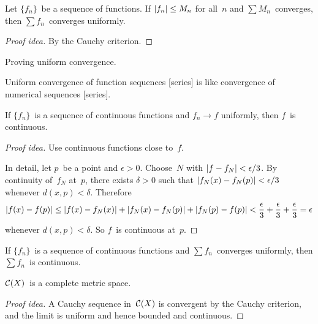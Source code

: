 \begin{thm}[Weierstrass]
Let \(\{f_n\}\)~be a sequence of functions. If \(|{f_n}|\le M_n\) for all~\(n\) and \(\sum M_n\)~converges, then \(\sum f_n\)~converges uniformly.
\end{thm}
\begin{proof}[Proof idea]
By the Cauchy criterion.
\end{proof}
\begin{app}
Proving uniform convergence.
\end{app}

\begin{rmk}
Uniform convergence of function sequences [series] is like convergence of numerical sequences [series].
\end{rmk}

\begin{thm}
If \(\{f_n\}\)~is a sequence of continuous functions and \(f_n\to f\) uniformly, then \(f\)~is continuous.
\end{thm}
\begin{proof}[Proof idea]
Use continuous functions close to~\(f\).

In detail, let \(p\)~be a point and \(\epsilon>0\). Choose~\(N\) with \(|{f-f_N}|<\epsilon/3\). By continuity of~\(f_N\) at~\(p\), there exists \(\delta>0\) such that \(|{f_N(x)-f_N(p)}|<\epsilon/3\) whenever \(d(x,p)<\delta\). Therefore
\[|{f(x)-f(p)}|\le|{f(x)-f_N(x)}|+|{f_N(x)-f_N(p)}|+|{f_N(p)-f(p)}|<\frac{\epsilon}{3}+\frac{\epsilon}{3}+\frac{\epsilon}{3}=\epsilon\]
whenever \(d(x,p)<\delta\). So \(f\)~is continuous at~\(p\).
\end{proof}

\begin{cor}
If \(\{f_n\}\)~is a sequence of continuous functions and \(\sum f_n\)~converges uniformly, then \(\sum f_n\)~is continuous.
\end{cor}

\begin{cor}
\(\mathcal{C}(X)\)~is a complete metric space.
\end{cor}
\begin{proof}[Proof idea]
A Cauchy sequence in~\(\mathcal{C}(X)\) is convergent by the Cauchy criterion, and the limit is uniform and hence bounded and continuous.
\end{proof}

